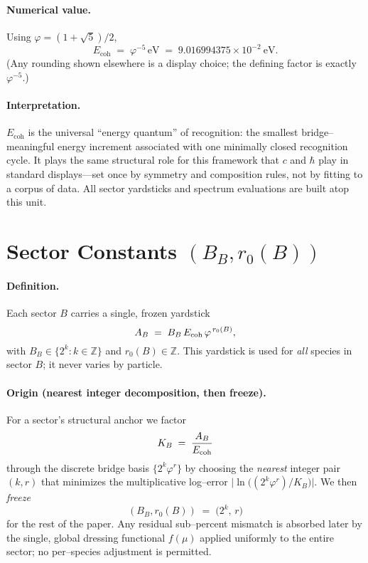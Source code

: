 \documentclass[epjc3]{svjour3}
\begin{document}
\paragraph{Numerical value.}
Using $\varphi=(1+\sqrt{5})/2$,
\[
E_{\mathrm{coh}} \;=\; \varphi^{-5}\,\mathrm{eV}
\;=\; 9.016994375\times 10^{-2}\ \mathrm{eV}.
\]
(Any rounding shown elsewhere is a display choice; the defining factor is exactly $\varphi^{-5}$.)

\paragraph{Interpretation.}
$E_{\mathrm{coh}}$ is the universal “energy quantum” of recognition: the smallest bridge–meaningful energy increment associated with one minimally closed recognition cycle. It plays the same structural role for this framework that $c$ and $\hbar$ play in standard displays—set once by symmetry and composition rules, not by fitting to a corpus of data. All sector yardsticks and spectrum evaluations are built atop this unit.

\section{Sector Constants $(B_B, r_0(B))$}

\paragraph{Definition.}
Each sector $B$ carries a single, frozen yardstick
\[
A_B \;=\; B_B\,E_{\rm coh}\,\varphi^{\,r_0(B)},
\]
with $B_B\in\{2^k:k\in\mathbb Z\}$ and $r_0(B)\in\mathbb Z$. This yardstick is used for \emph{all} species in sector $B$; it never varies by particle.

\paragraph{Origin (nearest integer decomposition, then freeze).}
For a sector’s structural anchor we factor
\[
K_B \;=\; \frac{A_B}{E_{\rm coh}}
\]
through the discrete bridge basis $\{2^k\varphi^{r}\}$ by choosing the \emph{nearest} integer pair $(k,r)$ that minimizes the multiplicative log–error
$\bigl|\ln\!\bigl((2^k\varphi^{r})/K_B\bigr)\bigr|$. We then \emph{freeze}
\[
(B_B,r_0(B)) \;=\; \bigl(2^k,\,r\bigr)
\]
for the rest of the paper. Any residual sub–percent mismatch is absorbed later by the single, global dressing functional $f(\mu)$ applied uniformly to the entire sector; no per–species adjustment is permitted.
\end{document}
